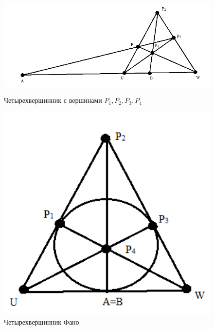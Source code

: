 \begin{figure}[H]
  \begin{center}
    \begin{minipage}[h]{0.68\linewidth}
        \includegraphics[width=1\textwidth]{authors/Stepanuk-1-fig-1.png}
        \caption{Четырехвершинник с вершинами $P_1, P_2, P_3, P_4$}
        \label{fig:Stepanuk-1-fig-1}
    \end{minipage}
\hfill
    \begin{minipage}[h]{0.28\linewidth}
        \includegraphics[width=1\textwidth]{authors/Stepanuk-1-fig-2.png}
        \caption{Четырехвершинник Фано}
        \label{fig:Stepanuk-1-fig-2}
    \end{minipage}


  \end{center}

\end{figure}
